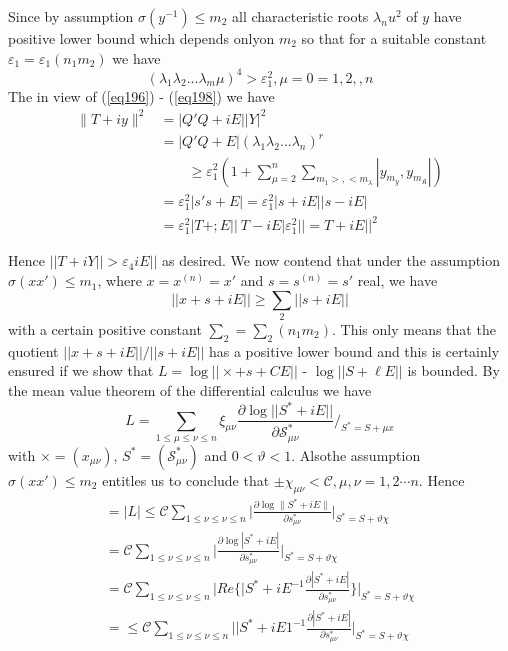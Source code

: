 Since by assumption $\sigma(y^{-1}) \leq m_2$ all characteristic roots
$\lambda_nu^2$ of $y$ have positive lower bound which depends 
only\pageoriginale on $m_2$ so that for a suitable constant
$\varepsilon_1 = \varepsilon _1 (n_1 m_2)$ we have    
\begin{equation*}
(\lambda_1 \lambda_2 \ldots \lambda_m \mu)^4 > \varepsilon_1^2, \mu =
  0= 1,  2,, n  \tag{198}\label{eq198} 
\end{equation*}
The in view of (\ref{eq196}) - (\ref{eq198}) we have 
\begin{align*}
\| T + i y \| ^2 & = |Q'Q + i E | |Y| ^2 \\
& = | Q'Q + E | ( \lambda_1 \lambda_2 \ldots \lambda_n )^r \\
& \qquad \geq  \varepsilon_1^2 (1 + \sum\limits_{\mu=2}^{n} \sum
\limits_{m_1>, <m_\lambda} | y _{m_y}, y _{m_\mathfrak{K}}|)\\
&= \varepsilon_1^2 | s's+ E | = \varepsilon_1^2 | s+ i E || s - i E |\\
&= \varepsilon_1^2 |T + ; E | |\ T - i E | \varepsilon_1 ^2 || = T + i
E ||^2
\end{align*}

Hence $|| T + i Y || > \varepsilon_4 i E ||$  as desired. 
We now contend that under the assumption $\sigma (xx') \le m_1$, where 
$x = x^{(n)} = x'$ and $s = s^(n) = s'$ real, we have 
\begin{equation*}
|| x + s + i E || \ge  \sum_2 || s + i E || \tag{199}\label{eq199}
\end{equation*}
with a certain positive constant $\sum_2 = \sum_2(n_1 m_2) $.
This only means that the quotient $|| x+ s + i E || /  || s + i E ||$
has a positive lower bound and this is certainly ensured if we show
that $L = \log || \times + s + CE||$ - $\log || S + \ell E ||$ is
bounded. By the mean value theorem of the differential calculus we
have 
$$
L = \sum_{1 \leq \mu \leq \nu \leq n } \xi_{\mu \nu } \frac{\partial 
  \log || S^* + i E ||} { \partial \mathscr{S}_{\mu \nu }^* }
\bigg/_{S^* = S + \mu x } 
$$
with $\times = (x_{\mu \nu })$, $S^* = (\mathscr{S}_{\mu \nu }^* )$ and
$0 <\vartheta < 1 $. Also\pageoriginale the assumption $\sigma (x x')
\le  m_2$ entitles us to conclude  that $\pm \chi_{\mu \nu} <
\mathscr{C}, \mu, \nu = 1,2 \cdots n $. Hence   
	\begin{align*}
=|L|  \le \mathscr{C} \sum_{1 \le \nu \le \nu \le n} \bigg |
\frac{\partial \log \|  S^* +  i E \|}{\partial s^*_{\mu \nu}} \bigg
|_{S^* = S+ \vartheta \chi}\\ 
= \mathscr{C} \sum_{1 \le \nu \le \nu \le n} \bigg | \frac{\partial
  \log |  S^* +  i E |}{\partial s^*_{\mu \nu}} \bigg |_{S^* = S+
  \vartheta \chi}\\ 
	= \mathscr{C} \sum_{1 \le \nu \le \nu \le n} \bigg | Re
        \bigg\{|S^* +iE^{-1}\frac{\partial |  S^* +  i E |} {\partial
          s^*_{\mu \nu}}\bigg\} \bigg |_{S^* = S+ \vartheta \chi}\\ 
=\le \mathscr{C} \sum_{1 \le \nu \le \nu \le n} \bigg ||S^* +iE1^{-1}
\frac{\partial |  S^* +  i E |}{\partial s^*_{\mu \nu}} \bigg |_{S^* =
  S+ \vartheta \chi} \tag{200}\label{eq200} 
	\end{align*}

